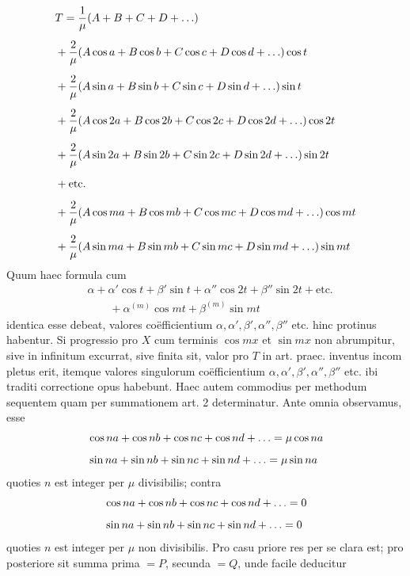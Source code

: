 \[
\begin{aligned}
&T=\frac{1}{\mu}(A+B+C+D+\mathinner{.\,.\,.})\\[5pt]
&+\frac{2}{\mu}(A\cos a+B\cos b+C\cos c+D\cos d+\mathinner{.\,.\,.})\cos t\\[5pt]
&+\frac{2}{\mu}(A\sin a+B\sin b+C\sin c+D\sin d+\mathinner{.\,.\,.})\sin t\\[5pt]
&+\frac{2}{\mu}(A\cos2a+B\cos2b+C\cos2c+D\cos2d+\mathinner{.\,.\,.})\cos2t\\[5pt]
&+\frac{2}{\mu}(A\sin2a+B\sin2b+C\sin2c+D\sin2d+\mathinner{.\,.\,.})\sin2t\\[5pt]
&+\mathrm{etc.}\\[5pt]
&+\frac{2}{\mu}(A\cos ma+B\cos mb+C\cos mc+D\cos md+\mathinner{.\,.\,.})\cos mt\\[5pt]
&+\frac{2}{\mu}(A\sin ma+B\sin mb+C\sin mc+D\sin md+\mathinner{.\,.\,.})\sin mt
\end{aligned}
\]
Quum haec formula cum
\[
\begin{aligned}
&\alpha+\alpha'\cos t+\beta'\sin t+\alpha''\cos2t+\beta''\sin2t+\mathrm{etc.}\\[5pt]&\qquad{}+\alpha^{(m)}\cos mt+\beta^{(m)}\sin mt
\end{aligned}
\]
identica esse debeat, valores co\"efficientium \(\alpha,\alpha',\beta',\alpha'',\beta''\) etc. hinc protinus
habentur.
Si progressio pro \(X\) cum terminis \(\cos mx\) et \(\sin mx\) non abrumpitur, sive
in infinitum excurrat, sive finita sit, valor pro \(T\) in art. praec. inventus incom%
pletus erit, itemque valores singulorum co\"efficientium \(\alpha,\alpha',\beta',\alpha'',\beta''\) etc. ibi
traditi correctione opus habebunt. Haec autem commodius per methodum sequentem quam per summationem art. 2 determinatur. Ante omnia observamus, esse
\[
\begin{aligned}
&\cos na+\cos nb+\cos nc+\cos nd+\mathinner{.\,.\,.}=\mu\cos na\\[5pt]
&\sin na+\sin nb+\sin nc+\sin nd+\mathinner{.\,.\,.}=\mu\sin na
\end{aligned}
\]
quoties \(n\) est integer per \(\mu\) divisibilis; contra
\[
\begin{aligned}
&\cos na+\cos nb+\cos nc+\cos nd+\mathinner{.\,.\,.}=0\\[5pt]
&\sin na+\sin nb+\sin nc+\sin nd+\mathinner{.\,.\,.}=0
\end{aligned}
\]
quoties \(n\) est integer per \(\mu\) non divisibilis. Pro casu priore res per se clara est;
pro posteriore sit summa prima \(=P\), secunda \(=Q\), unde facile deducitur
